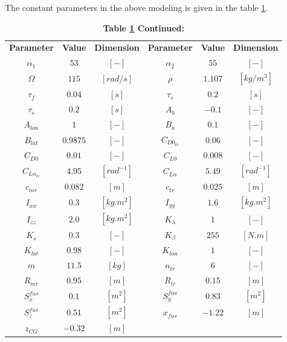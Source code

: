 The constant parameters in the above modeling is given in the table \ref{helicopter_parameters}.
\begin{longtable}{c|c|c||c|c|c} 
	\caption {Constant parameters in the helicopter modeling}\label{helicopter_parameters}\\\toprule
	\endfirsthead
	\caption* {\textbf{Table \ref{helicopter_parameters} Continued:} }\\\toprule
	\endhead
	\endfoot
	\bottomrule
	\endlastfoot
	\textbf{Parameter} & \textbf{Value} & \textbf{Dimension} & \textbf{Parameter} & \textbf{Value} & \textbf{Dimension} \\ \hline \hline
	$\alpha_{1}$ & $53$ &  $[-]$ & $\alpha_{2}$ & $55$ &  $[-]$ \\  \hline
	$ \Omega$ & $115 $ &  $[rad/s]$ & $\rho $ & $1.107 $ &  $[kg/m^3]$ \\ \hline
	$ \tau_f$ & $0.04 $ &  $[s]$ & $\tau_s $ & $ 0.2$ &  $[s]$ \\ \hline
	$\tau_s $ & $ 0.2$ &  $[s]$ & $A_b $ & $-0.1 $ &  $ [-]$ \\ \hline
	$A_{lon} $ & $ 1$ &  $[-]$ & $B_a $ & $0.1 $ &  $ [-]$ \\ \hline
	$B_{lat} $ & $0.9875 $ &  $[-]$ &$C_{D0_{tr}} $ & $0.06 $ &  $[-]$  \\ \hline
	$C_{D0} $ & $0.01 $ &  $[-]$ & $C_{L0} $ & $0.008 $ &  $[-]$ \\ \hline
	$C_{L\alpha_{tr}} $ & $4.95 $ &  $[rad^{-1}]$ & $C_{L\alpha} $ & $5.49 $ &  $[rad^{-1}]$ \\ \hline
	$c_{mr} $ & $0.082 $ &  $[m]$ & $c_{tr} $ & $0.025 $ &  $[m]$ \\ \hline
	$I_{xx} $ & $ 0.3$ &  $[kg.m^2] $  & $I_{yy}$ & $1.6$ & $[kg.m^2]$ \\ \hline
	$I_{zz} $ & $2.0 $ &  $[kg.m^2]$ & $K_\lambda $ & $1 $ &  $[-] $ \\ \hline
	$K_s $ & $0.3 $ &  $[-] $  & $K_\beta $ & $ 255$ &  $[N.m]$ \\ \hline
	$K_{lat} $ & $0.98 $ &  $[-] $  & $K_{lon} $ & $1 $ &  $[-] $ \\ \hline
	$m $ & $11.5 $ &  $[kg] $  & $n_{tr} $ & $6 $ &  $[-] $ \\ \hline
	$R_{mr} $ & $0.95 $ &  $[m]$  & $R_{tr} $ & $0.15 $ &  $[m] $ \\ \hline
	$S_x^{fus} $ & $0.1 $ &  $[m^2] $  & $S_y^{fus} $ & $0.83 $ &  $[m^2] $ \\ \hline
	$S_z^{fus} $ & $0.51 $ &  $[m^2] $  & $x_{fus} $ & $-1.22 $ &  $[m] $ \\ \hline
	$z_{CG}$ & $-0.32 $ &  $[m] $  &  &  & \\ 
\end{longtable}

